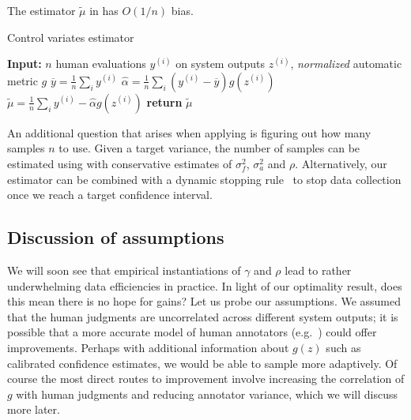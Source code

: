 \begin{proposition}
\label{prop:added_bias}
The estimator $\widetilde{\mu}$ in  has $O(1/n)$ bias.
\end{proposition}

\begin{algorithm}
      \caption{\label{alg:estimate}Control variates estimator}
      \begin{algorithmic}[1]
   \State{} {\bfseries Input:} $n$ human evaluations $y^{(i)}$ on system outputs $z^{(i)}$, \textit{normalized} automatic metric $g$ 
   \State{} $\overline{y} = \frac{1}{n} \sum_i y^{(i)}$
   \State{} $\hat{\alpha} = \frac{1}{n} \sum_i (y^{(i)} - \overline{y}) g(z^{(i)})$
   \State{} $\widetilde{\mu} = \frac{1}{n} \sum_i y^{(i)} - \hat{\alpha} g(z^{(i)})$
   \State{} {\bfseries return} $\widetilde{\mu}$
\end{algorithmic}
\end{algorithm}

An additional question that arises when applying  is figuring out how many samples $n$ to use.
Given a target variance, the number of samples can be estimated using  with conservative estimates of $\sigma^2_f$, $\sigma^2_a$ and $\rho$.
Alternatively, our estimator can be combined with a dynamic stopping rule~\citep{mnih2008empirical} to stop data collection once we reach a target confidence interval.

\subsection{Discussion of assumptions}
We will soon see that empirical instantiations of $\gamma$ and $\rho$ lead to rather underwhelming data efficiencies in practice.
In light of our optimality result, does this mean there is no hope for gains?
Let us probe our assumptions.
We assumed that the human judgments are uncorrelated across different system outputs;
it is possible that a more accurate model of human annotators (e.g.\ \citet{passonneau2014benefits}) could offer improvements.
Perhaps with additional information about $g(z)$ such as calibrated confidence estimates,
we would be able to sample more adaptively.
Of course the most direct routes to improvement involve increasing the correlation of $g$ with human judgments and reducing annotator variance,
which we will discuss more later.

